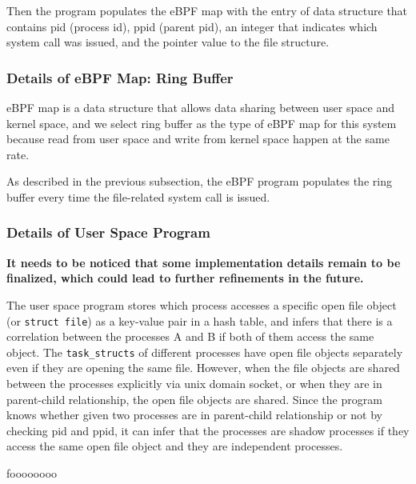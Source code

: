 Then the program populates the eBPF map with the entry of data structure that
contains pid (process id), ppid (parent pid),  an integer that indicates which system call was issued,
and the pointer value to the file structure.

\subsubsection{Details of eBPF Map: Ring Buffer}
eBPF map is a data structure that allows data sharing between user space and kernel space, and
we select ring buffer as the type of eBPF map for this system because read from user space
and write from kernel space happen at the same rate.

As described in the previous subsection, the eBPF program populates the ring buffer
every time the file-related system call is issued.

\subsubsection{Details of User Space Program}
\textbf{It needs to be noticed that some implementation details remain to be finalized, which could
  lead to further refinements in the future.
}

The user space program stores which process accesses a specific open file object (or \texttt{struct file})
as a key-value pair in a hash table, and infers that there is a correlation between the processes
A and B if both of them access the same object.
The \texttt{task\_structs} of different processes have open file objects separately
even if they are opening the same file.
However, when the file objects are shared between the processes explicitly via unix domain socket, or
when they are in parent-child relationship, the open file objects are shared.
Since the program knows whether given two processes are in parent-child relationship or not
by checking pid and ppid,
it can infer that the processes are shadow processes
if they access the same open file object and they are independent processes.

\begin{algorithm}
  \caption{foooooooo}
  \label{algo:1}
  \begin{algorithmic}[1]
    \EndWhile
    \EndFor
    \EndProcedure
  \end{algorithmic}
\end{algorithm}
